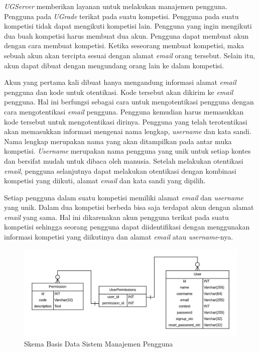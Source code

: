 \par \textit{UGServer} memberikan layanan untuk melakukan manajemen pengguna. Pengguna pada \textit{UGrade} terikat pada suatu kompetisi. Pengguna pada suatu kompetisi tidak dapat mengikuti kompetisi lain. Pengguna yang ingin mengikuti dua buah kompetisi harus membuat dua akun. Pengguna dapat membuat akun dengan cara membuat kompetisi. Ketika seseorang membuat kompetisi, maka sebuah akun akan tercipta sesuai dengan alamat \textit{email} orang tersebut. Selain itu, akun dapat dibuat dengan mengundang orang lain ke dalam kompetisi.

\par Akun yang pertama kali dibuat hanya mengandung informasi alamat \textit{email} pengguna dan kode untuk otentikasi. Kode tersebut akan dikirim ke \textit{email} pengguna. Hal ini berfungsi sebagai cara untuk mengotentikasi pengguna dengan cara mengotentikasi \textit{email} pengguna. Pengguna kemudian harus memasukkan kode tersebut untuk mengotentikasi dirinya. Pengguna yang telah terotentikasi akan memasukkan informasi mengenai nama lengkap, \textit{username} dan kata sandi. Nama lengkap merupakan nama yang akan ditampilkan pada antar muka kompetisi. \textit{Username} merupakan nama pengguna yang unik untuk setiap kontes dan bersifat mudah untuk dibaca oleh manusia. Setelah melakukan otentikasi \textit{email}, pengguna selanjutnya dapat melakukan otentikasi dengan kombinasi kompetisi yang diikuti, alamat \textit{email} dan kata sandi yang dipilih. 

\par Setiap pengguna dalam suatu kompetisi memiliki alamat \textit{email} dan \textit{username} yang unik. Dalam dua kompetisi berbeda bisa saja terdapat akun dengan alamat \textit{email} yang sama. Hal ini dikarenakan akun pengguna terikat pada suatu kompetisi sehingga seorang pengguna dapat diidentifikasi dengan menggunakan informasi kompetisi yang diikutinya dan alamat \textit{email} atau \textit{username}-nya.

\begin{figure}[ht!]
    \centering
    \includegraphics[width=\textwidth]{images/user-schema}
    \caption{Skema Basis Data Sistem Manajemen Pengguna}
    \label{fig:user-schema}
\end{figure}

